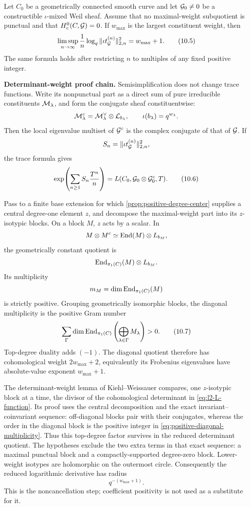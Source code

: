 \begin{foundation}
\begin{theorem}
\label{thm:l2-weight-criterion}
Let \(C_0\) be a geometrically connected smooth curve and let
\(\mathcal G_0\ne0\) be a constructible \(\iota\)-mixed Weil sheaf.  Assume
that no maximal-weight subquotient is punctual and that
\(H_c^0(C,\mathcal G)=0\).  If \(w_{\max}\) is the largest constituent weight,
then
\[
 \limsup_{n\to\infty}\frac1n
 \log_q\|\iota t_{\mathcal G}^{(n)}\|_{2,n}^2
 =w_{\max}+1.
\tag{10.5}\label{eq:l2-weight-growth}
\]
The same formula holds after restricting \(n\) to multiples of any
fixed positive integer.
\end{theorem}

\smallskip
\textbf{Determinant-weight proof chain.}
Semisimplification does not change trace functions.  Write its
nonpunctual part as a direct sum of pure irreducible constituents
\(\mathcal M_\lambda\), and form the conjugate sheaf constituentwise:
\[
 \mathcal M_\lambda^c
 =\mathcal M_\lambda^\vee\otimes\mathcal L_{b_\lambda},
 \qquad
 \iota(b_\lambda)=q^{w_\lambda}.
\]
Then the local eigenvalue multiset of \(\mathcal G^c\) is the complex conjugate
of that of \(\mathcal G\).  If
\[
 S_n=\|\iota t_{\mathcal G}^{(n)}\|_{2,n}^2,
\]
the trace formula gives
\[
 \exp\!\left(\sum_{n\ge1}S_n\frac{T^n}{n}\right)
 =L(C_0,\mathcal G_0\otimes\mathcal G_0^c,T).
\tag{10.6}\label{eq:l2-L-function}
\]

Pass to a finite base extension for which
\cref{prop:positive-degree-center} supplies a central degree-one element
\(z\), and decompose the maximal-weight part into its \(z\)-isotypic
blocks.  On a block \(M\), \(z\) acts by a scalar.  In
\[
 M\otimes M^c\simeq\operatorname{End}(M)\otimes L_{b_M},
\]
the geometrically constant quotient is
\[
 \operatorname{End}_{\pi_1(C)}(M)\otimes L_{b_M}.
\]
Its multiplicity
\[
 m_M=\dim\operatorname{End}_{\pi_1(C)}(M)
\]
is strictly positive.  Grouping geometrically isomorphic blocks, the
diagonal multiplicity is the positive Gram number
\[
 \sum_{\Gamma}
 \dim\operatorname{End}_{\pi_1(C)}
 \left(\bigoplus_{\lambda\in\Gamma}M_\lambda\right)>0.
\tag{10.7}\label{eq:positive-diagonal-multiplicity}
\]
Top-degree duality adds \((-1)\).  The diagonal quotient therefore has
cohomological weight \(2w_{\max}+2\), equivalently its Frobenius
eigenvalues have absolute-value exponent \(w_{\max}+1\).

The determinant-weight lemma of Kiehl--Weissauer compares, one
\(z\)-isotypic block at a time, the divisor of the cohomological
determinant in \eqref{eq:l2-L-function}.  Its proof uses the central
decomposition and the exact invariant--coinvariant sequence:
off-diagonal blocks pair with their conjugates, whereas the order in
the diagonal block is the positive integer in
\eqref{eq:positive-diagonal-multiplicity}.  Thus this top-degree factor
survives in the reduced determinant quotient.  The hypotheses exclude
the two extra terms in that exact sequence: a maximal punctual block and
a compactly-supported degree-zero block.  Lower-weight isotypes are
holomorphic on the outermost circle.  Consequently the reduced
logarithmic derivative has radius
\[
 q^{-(w_{\max}+1)}.
\]
This is the noncancellation step; coefficient positivity is not used as
a substitute for it.


\end{foundation}
